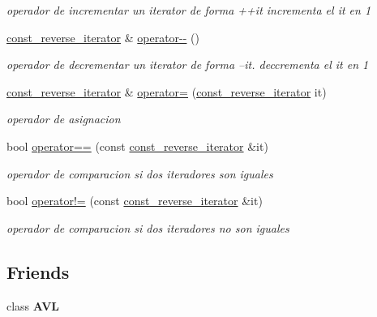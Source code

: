 \begin{DoxyCompactItemize}
\begin{DoxyCompactList}\small\item\em operador de incrementar un iterator de forma ++it incrementa el it en 1 \end{DoxyCompactList}\item 
\hypertarget{classAVL_1_1const__reverse__iterator_a950014a019ac0867c662bc326da5c5f5}{\hyperlink{classAVL_1_1const__reverse__iterator}{const\-\_\-reverse\-\_\-iterator} \& \hyperlink{classAVL_1_1const__reverse__iterator_a950014a019ac0867c662bc326da5c5f5}{operator-\/-\/} ()}\label{classAVL_1_1const__reverse__iterator_a950014a019ac0867c662bc326da5c5f5}

\begin{DoxyCompactList}\small\item\em operador de decrementar un iterator de forma --it. deccrementa el it en 1 \end{DoxyCompactList}\item 
\hyperlink{classAVL_1_1const__reverse__iterator}{const\-\_\-reverse\-\_\-iterator} \& \hyperlink{classAVL_1_1const__reverse__iterator_a20235902c487b09eebc8b0002ca0d6e7}{operator=} (\hyperlink{classAVL_1_1const__reverse__iterator}{const\-\_\-reverse\-\_\-iterator} it)
\begin{DoxyCompactList}\small\item\em operador de asignacion \end{DoxyCompactList}\item 
bool \hyperlink{classAVL_1_1const__reverse__iterator_a45dd7fbeecc5b20a4262156b4ab46026}{operator==} (const \hyperlink{classAVL_1_1const__reverse__iterator}{const\-\_\-reverse\-\_\-iterator} \&it)
\begin{DoxyCompactList}\small\item\em operador de comparacion si dos iteradores son iguales \end{DoxyCompactList}\item 
bool \hyperlink{classAVL_1_1const__reverse__iterator_afd7f4d6a14516b94bb90f52726736bd4}{operator!=} (const \hyperlink{classAVL_1_1const__reverse__iterator}{const\-\_\-reverse\-\_\-iterator} \&it)
\begin{DoxyCompactList}\small\item\em operador de comparacion si dos iteradores no son iguales \end{DoxyCompactList}\end{DoxyCompactItemize}
\subsection*{Friends}
\begin{DoxyCompactItemize}
\item 
\hypertarget{classAVL_1_1const__reverse__iterator_acba9d79a1cae18f44a9bf4aa4d0de787}{class {\bfseries A\-V\-L}}\label{classAVL_1_1const__reverse__iterator_acba9d79a1cae18f44a9bf4aa4d0de787}

\end{DoxyCompactItemize}


